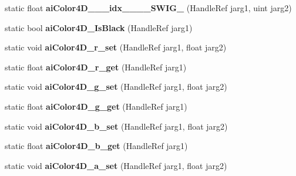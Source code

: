 \begin{DoxyCompactItemize}
\item 
\hypertarget{class_assimp_p_i_n_v_o_k_e_a2ae35f5be537fddabf94ab8e8283a5a3}{static float {\bfseries ai\+Color4\+D\+\_\+\+\_\+\+\_\+idx\+\_\+\+\_\+\+\_\+\+\_\+\+S\+W\+I\+G\+\_} (Handle\+Ref jarg1, uint jarg2)}\label{class_assimp_p_i_n_v_o_k_e_a2ae35f5be537fddabf94ab8e8283a5a3}

\item 
\hypertarget{class_assimp_p_i_n_v_o_k_e_a72545063cf97584bb7497a80885abb54}{static bool {\bfseries ai\+Color4\+D\+\_\+\+Is\+Black} (Handle\+Ref jarg1)}\label{class_assimp_p_i_n_v_o_k_e_a72545063cf97584bb7497a80885abb54}

\item 
\hypertarget{class_assimp_p_i_n_v_o_k_e_a6564d2ada077697fc0c8805c47ec403e}{static void {\bfseries ai\+Color4\+D\+\_\+r\+\_\+set} (Handle\+Ref jarg1, float jarg2)}\label{class_assimp_p_i_n_v_o_k_e_a6564d2ada077697fc0c8805c47ec403e}

\item 
\hypertarget{class_assimp_p_i_n_v_o_k_e_ad04b6b783b0d7597dc4b32b965900000}{static float {\bfseries ai\+Color4\+D\+\_\+r\+\_\+get} (Handle\+Ref jarg1)}\label{class_assimp_p_i_n_v_o_k_e_ad04b6b783b0d7597dc4b32b965900000}

\item 
\hypertarget{class_assimp_p_i_n_v_o_k_e_acc2cc5f6951198bc83129167cf32c93e}{static void {\bfseries ai\+Color4\+D\+\_\+g\+\_\+set} (Handle\+Ref jarg1, float jarg2)}\label{class_assimp_p_i_n_v_o_k_e_acc2cc5f6951198bc83129167cf32c93e}

\item 
\hypertarget{class_assimp_p_i_n_v_o_k_e_a86f9c0e4830b3186902f0b1da8fdb11d}{static float {\bfseries ai\+Color4\+D\+\_\+g\+\_\+get} (Handle\+Ref jarg1)}\label{class_assimp_p_i_n_v_o_k_e_a86f9c0e4830b3186902f0b1da8fdb11d}

\item 
\hypertarget{class_assimp_p_i_n_v_o_k_e_aec47f2bebab0c57a0d8f9d7bbd0edab0}{static void {\bfseries ai\+Color4\+D\+\_\+b\+\_\+set} (Handle\+Ref jarg1, float jarg2)}\label{class_assimp_p_i_n_v_o_k_e_aec47f2bebab0c57a0d8f9d7bbd0edab0}

\item 
\hypertarget{class_assimp_p_i_n_v_o_k_e_a0ffc9e730c859a77fc7043532a32915e}{static float {\bfseries ai\+Color4\+D\+\_\+b\+\_\+get} (Handle\+Ref jarg1)}\label{class_assimp_p_i_n_v_o_k_e_a0ffc9e730c859a77fc7043532a32915e}

\item 
\hypertarget{class_assimp_p_i_n_v_o_k_e_a7ea678c4ff2a353da0c0e87c30ce7a7d}{static void {\bfseries ai\+Color4\+D\+\_\+a\+\_\+set} (Handle\+Ref jarg1, float jarg2)}\label{class_assimp_p_i_n_v_o_k_e_a7ea678c4ff2a353da0c0e87c30ce7a7d}


\end{DoxyCompactItemize}
